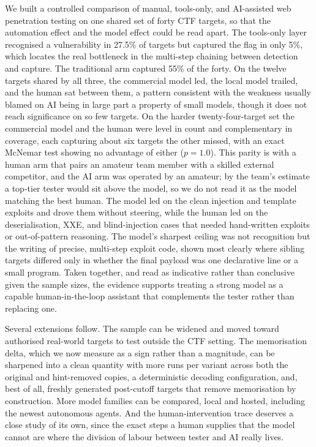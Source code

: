 \documentclass[conference]{IEEEtran}
\begin{document}
We built a controlled comparison of manual, tools-only, and AI-assisted web penetration testing on one shared set of forty CTF targets, so that the automation effect and the model effect could be read apart. The tools-only layer recognised a vulnerability in 27.5\% of targets but captured the flag in only 5\%, which locates the real bottleneck in the multi-step chaining between detection and capture. The traditional arm captured 55\% of the forty. On the twelve targets shared by all three, the commercial model led, the local model trailed, and the human sat between them, a pattern consistent with the weakness usually blamed on AI being in large part a property of small models, though it does not reach significance on so few targets. On the harder twenty-four-target set the commercial model and the human were level in count and complementary in coverage, each capturing about six targets the other missed, with an exact McNemar test showing no advantage of either ($p=1.0$). This parity is with a human arm that pairs an amateur team member with a skilled external competitor, and the AI arm was operated by an amateur; by the team's estimate a top-tier tester would sit above the model, so we do not read it as the model matching the best human. The model led on the clean injection and template exploits and drove them without steering, while the human led on the deserialisation, XXE, and blind-injection cases that needed hand-written exploits or out-of-pattern reasoning. The model's sharpest ceiling was not recognition but the writing of precise, multi-step exploit code, shown most clearly where sibling targets differed only in whether the final payload was one declarative line or a small program. Taken together, and read as indicative rather than conclusive given the sample sizes, the evidence supports treating a strong model as a capable human-in-the-loop assistant that complements the tester rather than replacing one.

Several extensions follow. The sample can be widened and moved toward authorised real-world targets to test outside the CTF setting. The memorisation delta, which we now measure as a sign rather than a magnitude, can be sharpened into a clean quantity with more runs per variant across both the original and hint-removed copies, a deterministic decoding configuration, and, best of all, freshly generated post-cutoff targets that remove memorisation by construction. More model families can be compared, local and hosted, including the newest autonomous agents. And the human-intervention trace deserves a close study of its own, since the exact steps a human supplies that the model cannot are where the division of labour between tester and AI really lives.
\end{document}
